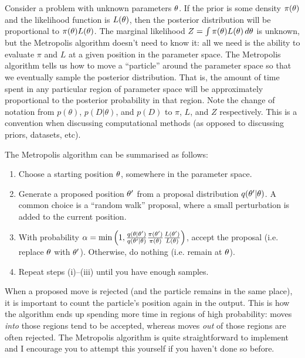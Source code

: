 Consider a problem with unknown
parameters $\theta$. If the prior is some density $\pi(\theta)$ and the likelihood
function is $L(\theta)$, then the posterior distribution will be
proportional to $\pi(\theta)L(\theta)$. The marginal likelihood
$Z = \int \pi(\theta) L(\theta) \, d\theta$ is unknown,
but the Metropolis algorithm doesn't need to know it: all we need is the
ability to evaluate $\pi$ and $L$ at a given position in the parameter space. The Metropolis algorithm tells us how to move a ``particle'' around the
parameter space so that we eventually sample the posterior distribution.
That is, the amount of time spent in any particular region of parameter space
will be approximately proportional to the posterior probability in that
region. Note the change of notation from $p(\theta)$, $p(D|\theta)$, and
$p(D)$ to $\pi$, $L$, and $Z$ respectively. This is a convention when discussing
computational methods (as opposed to discussing priors, datasets, etc).

The Metropolis algorithm can be summarised as follows:
\begin{enumerate}
\item Choose a starting position $\theta$, somewhere in the parameter space.
\item Generate a proposed position $\theta'$ from a proposal distribution
$q(\theta'|\theta)$. A common choice is a ``random walk'' proposal, where a small
perturbation is added to the current position.
\item With probability
$\alpha=\min\left(1, \frac{q(\theta|\theta')}{q(\theta'|\theta)}\frac{\pi(\theta')}{\pi(\theta)}\frac{L(\theta')}{L(\theta)}\right)$, accept the proposal
(i.e. replace $\theta$ with $\theta'$). Otherwise, do nothing (i.e. remain at $\theta$).
\item Repeat steps (i)--(iii) until you have enough samples.
\end{enumerate}

When a proposed move is rejected (and the particle remains in the same place),
it is important to count the particle's position again in the output. This is
how the algorithm ends up spending more time in regions of high probability:
moves {\it into} those regions tend to be accepted, whereas moves {\it out}
of those regions are often rejected. The Metropolis algorithm is quite straightforward to implement and I encourage
you to attempt this yourself if you haven't done so before.

